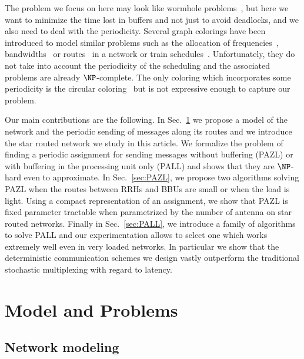 \documentclass[10pt, conference, letterpaper]{IEEEtran}
\begin{document}
The problem we focus on here may look like wormhole problems~\cite{cole1996benefit}, but here we want to minimize the time lost in buffers and not just to avoid deadlocks, and we also need to deal with the periodicity. Several graph colorings have been introduced to model similar problems such as the allocation of frequencies~\cite{borndorfer1998frequency}, bandwidths~\cite{erlebach2001complexity} or routes~\cite{cole1996benefit} in a network or train schedules~\cite{strotmann2007railway}. Unfortunately, they do not take into account the periodicity of the scheduling and the associated problems are already $\NP$-complete. The only coloring which incorporates some periodicity is the circular coloring~\cite{zhou2013multiple, zhu2001circular,zhu2006recent} but is not expressive enough to capture our problem.



Our main contributions are the following.
 In Sec.~\ref{sec:def} we propose a model of the network and the periodic sending of messages along its routes
 and we introduce the star routed network we study in this article. 
 We formalize the problem of finding a periodic assignment for sending messages without buffering (PAZL) or
 with buffering in the processing unit only (PALL) and shows that they are $\NP$-hard even to approximate.
In Sec.~\ref{sec:PAZL}, we propose two algorithms solving PAZL when the routes between RRHs and BBUs are small
or when the load is light. Using a compact representation of an assignment, we show that PAZL is fixed parameter tractable when parametrized by the number of antenna on star routed networks.
Finally in Sec.~\ref{sec:PALL}, we introduce a family of algorithms to solve PALL and our experimentation 
allows to select one which works extremely well even in very loaded networks. In particular we show that the deterministic communication schemes we design vastly outperform the traditional stochastic multiplexing with regard to latency. 


\section{Model and Problems}\label{sec:def}

  \subsection{Network modeling}
  
\end{document}
